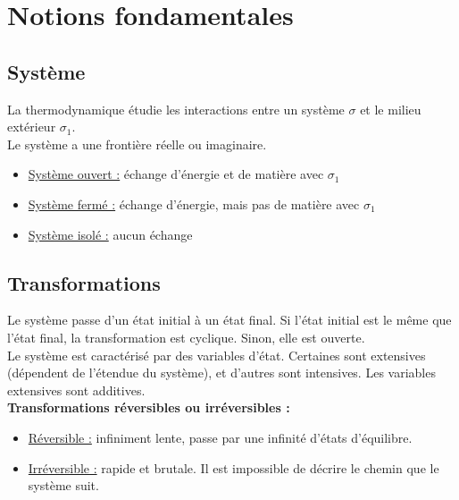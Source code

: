 \documentclass[13pt, twoside, a4paper, french]{report}
\begin{document}
    \section{Notions fondamentales}\label{sec:notions-fondamentales}

        \subsection{Système}\label{subsec:systeme}

            La thermodynamique étudie les interactions entre un système $\sigma$ et le milieu extérieur $\sigma_1$.\\
            Le système a une frontière réelle ou imaginaire.
            \vspace{5pt}
            \begin{itemize}
                \item \underline{Système ouvert :} échange d'énergie et de matière avec $\sigma_1$
                \item \underline{Système fermé :} échange d'énergie, mais pas de matière avec $\sigma_1$
                \item \underline{Système isolé :} aucun échange
            \end{itemize}

        \subsection{Transformations}\label{subsec:transformations}

            Le système passe d'un état initial à un état final.
            Si l'état initial est le même que l'état final, la transformation est cyclique.
            Sinon, elle est ouverte.\\

            Le système est caractérisé par des variables d'état.
            Certaines sont extensives (dépendent de l'étendue du système), et d'autres sont intensives.
            Les variables extensives sont additives.\\

            \textbf{Transformations réversibles ou irréversibles :}
            \vspace{5pt}
            \begin{itemize}
                \item \underline{Réversible :} infiniment lente, passe par une infinité d'états d'équilibre.
                \item \underline{Irréversible :} rapide et brutale.
                Il est impossible de décrire le chemin que le système suit.
            \end{itemize}
            \vspace{12pt}
\end{document}
